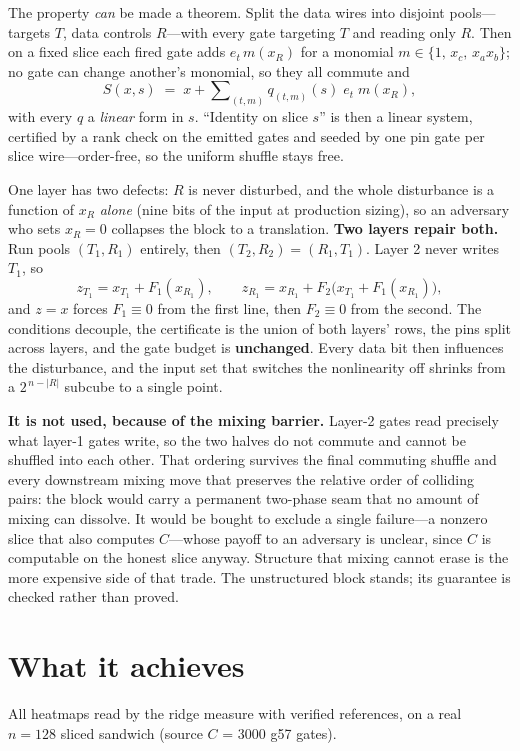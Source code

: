 \documentclass[11pt]{article}
\begin{document}
The property \emph{can} be made a theorem. Split the data wires into disjoint
pools---targets $T$, data controls $R$---with every gate targeting $T$ and
reading only $R$. Then on a fixed slice each fired gate adds $e_t\,m(x_R)$ for a
monomial $m\in\{1,\,x_c,\,x_a x_b\}$; no gate can change another's monomial, so
they all commute and
\[
S(x,s) \;=\; x + \sum\nolimits_{(t,m)} q_{(t,m)}(s)\; e_t\; m(x_R),
\]
with every $q$ a \emph{linear} form in $s$. ``Identity on slice $s$'' is then a
linear system, certified by a rank check on the emitted gates and seeded by one
pin gate per slice wire---order-free, so the uniform shuffle stays free.

One layer has two defects: $R$ is never disturbed, and the whole disturbance is
a function of $x_R$ \emph{alone} (nine bits of the input at production sizing),
so an adversary who sets $x_R = 0$ collapses the block to a translation.
\textbf{Two layers repair both.} Run pools $(T_1,R_1)$ entirely, then
$(T_2,R_2)=(R_1,T_1)$. Layer 2 never writes $T_1$, so
\[
z_{T_1} = x_{T_1} + F_1(x_{R_1}), \qquad
z_{R_1} = x_{R_1} + F_2\bigl(x_{T_1} + F_1(x_{R_1})\bigr),
\]
and $z=x$ forces $F_1\equiv 0$ from the first line, then $F_2\equiv 0$ from the
second. The conditions decouple, the certificate is the union of both layers'
rows, the pins split across layers, and the gate budget is \textbf{unchanged}.
Every data bit then influences the disturbance, and the input set that switches
the nonlinearity off shrinks from a $2^{\,n-|R|}$ subcube to a single point.

\textbf{It is not used, because of the mixing barrier.} Layer-2 gates read
precisely what layer-1 gates write, so the two halves do not commute and cannot
be shuffled into each other. That ordering survives the final commuting shuffle
and every downstream mixing move that preserves the relative order of colliding
pairs: the block would carry a permanent two-phase seam that no amount of mixing
can dissolve. It would be bought to exclude a single failure---a nonzero slice
that also computes $C$---whose payoff to an adversary is unclear, since $C$ is
computable on the honest slice anyway. Structure that mixing cannot erase is the
more expensive side of that trade. The unstructured block stands; its guarantee
is checked rather than proved.

\section{What it achieves}

All heatmaps read by the ridge measure with verified references, on a real
$n{=}128$ sliced sandwich (source $C$ = 3000 g57 gates).
\end{document}
